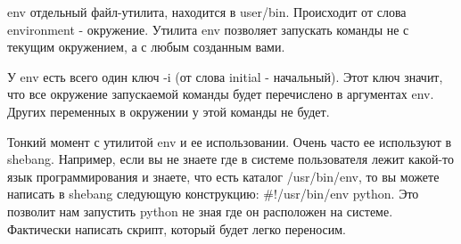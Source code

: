 \begin{defi}{env}
	отдельный файл-утилита, находится в user/bin. Происходит от слова environment - окружение. Утилита env позволяет запускать команды не с текущим окружением, а с любым созданным вами.
\end{defi}

У env есть всего один ключ -i (от слова initial - начальный). Этот ключ значит, что все окружение запускаемой команды будет перечислено в аргументах env. Других переменных в окружении у этой команды не будет.

Тонкий момент с утилитой env и ее использовании. Очень часто ее используют в shebang. Например, если вы не знаете где в системе пользователя лежит какой-то язык программирования и знаете, что есть каталог /usr/bin/env, то вы можете написать в shebang следующую конструкцию: \#!/usr/bin/env python. Это позволит нам запустить python не зная где он расположен на системе. Фактически написать скрипт, который будет легко переносим.
